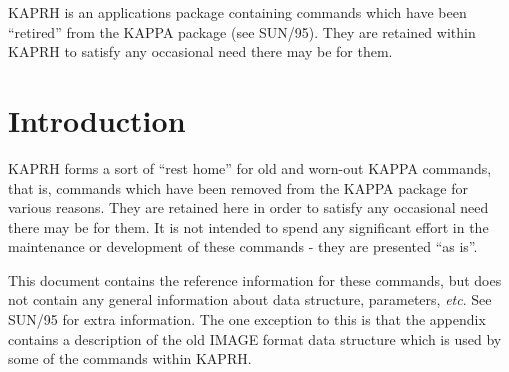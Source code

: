 \documentclass[twoside,11pt]{article}
\newcommand{\stardocinitials}  {SUN}
\newcommand{\stardocnumber}    {239.2}
\newcommand{\stardocname}{\stardocinitials /\stardocnumber}
\newenvironment{latexonly}{}{}
\newcommand{\xlabel}[1]{}
\newcommand{\latexonlytoc}[0]{\tableofcontents}
\renewcommand{\thepage}{\roman{page}}
\begin{document}
{\footnotesize KAPRH} is an applications package containing commands 
which have been ``retired'' from the KAPPA package (see SUN/95). They
are retained within KAPRH to satisfy any occasional need there may be for
them. 
 \newpage
 \begin{latexonly}
   \setlength{\parskip}{0mm}
   \latexonlytoc
   \setlength{\parskip}{\medskipamount}
   \markboth{\stardocname}{\stardocname}
 \end{latexonly}
\cleardoublepage
\renewcommand{\thepage}{\arabic{page}}
\setcounter{page}{1}


\section{\xlabel{se_kaprhintro}Introduction\label{se:kaprhintro}}

KAPRH forms a sort of ``rest home'' for old and worn-out KAPPA commands,
that is, commands which have been removed from the KAPPA package for 
various reasons. They are retained here in order to satisfy
any occasional need there may be for them. It is not intended to spend
any significant effort in the maintenance or development of these
commands - they are presented ``as is''. 

This document contains the reference information for these commands, but
does not contain any general information about data structure,
parameters, \emph{etc}. See SUN/95 for extra information. The one
exception to this is that the appendix contains a description of the 
old IMAGE format data structure which is used by some of the commands within 
KAPRH.
\end{document}
